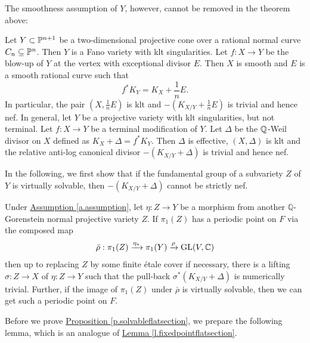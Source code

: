 The smoothness assumption of $Y$, however, cannot be removed in the theorem above: 
\begin{exa}
\label{e.counter-example-for-singlar-base}
Let $Y\subset \mathbb P^{n+1}$ be a two-dimensional projective cone over a rational normal curve $C_n\subseteq \mathbb P^n$. Then $Y$ is a Fano variety with klt singularities. Let $f:X\rightarrow Y$ be the blow-up of $Y$ at the vertex with exceptional divisor $E$. Then $X$ is smooth and $E$ is a smooth rational curve such that 
\[
f^*K_Y=K_X+\frac{1}{n}E.
\]
In particular, the pair $(X,\frac{1}{n}E)$ is klt and $-(K_{X/Y}+\frac{1}{n}E)$ is trivial and hence nef. In general, let $Y$ be a projective variety with klt singularities, but not terminal. Let $f:X\rightarrow Y$ be a terminal modification of $Y$. Let $\Delta$ be the $\mathbb Q$-Weil divisor on $X$ defined as $K_X+\Delta=f^*K_Y$. Then $\Delta$ is effective, $(X,\Delta)$ is klt and the relative  anti-log canonical divisor $-(K_{X/Y}+\Delta)$ is trivial and hence nef. 
\end{exa}

In the following, we first show that if the fundamental group of a subvariety $Z$ of $Y$ is virtually solvable, then $-(K_{X/Y}+\Delta)$ cannot be strictly nef.

\begin{prop}
	\label{p.solvableflatsection}
	Under {\hyperref[a.assumption]{Assumption \ref*{a.assumption}}}, let $\eta:Z\rightarrow Y$ be a morphism from another  $\mathbb{Q}$-Gorenstein normal projective   variety $Z$. 
	If $\pi_1(Z)$ has a periodic point on $F$ via the composed map
	\[
	\bar{\rho}:\pi_1(Z) \xrightarrow{\eta_*} \pi_1(Y) \xrightarrow{\rho} \textup{GL}(V,\mathbb C)
	\]
 then up to replacing $Z$ by some  finite \'etale cover if necessary,  
	there is a lifting $\sigma:Z\rightarrow X$ of $\eta:Z\rightarrow Y$ such that the pull-back $\sigma^*(K_{X/Y}+\Delta)$ is numerically trivial.
Further, if the image of $\pi_1(Z)$ under $\bar{\rho}$ is virtually solvable, then we can get such a periodic point on $F$. 
\end{prop}

Before we prove {\hyperref[p.solvableflatsection]{Proposition  \ref*{p.solvableflatsection}}}, we prepare the following lemma, which is an analogue of {\hyperref[l.fixedpointflatsection]{Lemma \ref*{l.fixedpointflatsection}}}. 

